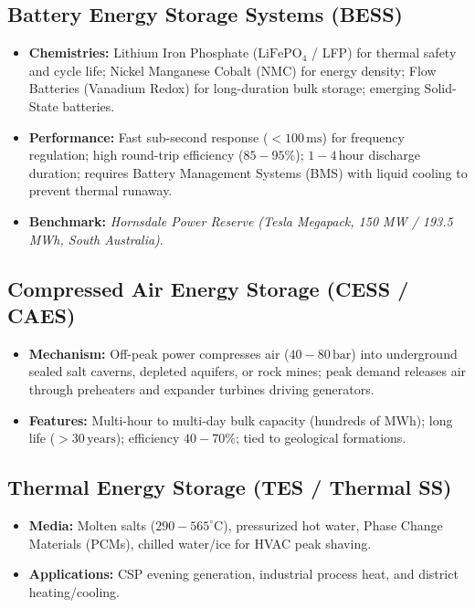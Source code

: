 \documentclass[11pt,a4paper]{article}
\begin{document}
\subsection{Battery Energy Storage Systems (BESS)}
\begin{itemize}
  \item \textbf{Chemistries:} Lithium Iron Phosphate ($\text{LiFePO}_4$ / LFP) for thermal safety and cycle life; Nickel Manganese Cobalt (NMC) for energy density; Flow Batteries (Vanadium Redox) for long-duration bulk storage; emerging Solid-State batteries.
  \item \textbf{Performance:} Fast sub-second response ($<100\,\text{ms}$) for frequency regulation; high round-trip efficiency ($85-95\%$); $1-4\,\text{hour}$ discharge duration; requires Battery Management Systems (BMS) with liquid cooling to prevent thermal runaway.
  \item \textbf{Benchmark:} \emph{Hornsdale Power Reserve (Tesla Megapack, 150 MW / 193.5 MWh, South Australia)}.
\end{itemize}

\subsection{Compressed Air Energy Storage (CESS / CAES)}
\begin{itemize}
  \item \textbf{Mechanism:} Off-peak power compresses air ($40-80\,\text{bar}$) into underground sealed salt caverns, depleted aquifers, or rock mines; peak demand releases air through preheaters and expander turbines driving generators.
  \item \textbf{Features:} Multi-hour to multi-day bulk capacity (hundreds of MWh); long life ($>30\,\text{years}$); efficiency $40-70\%$; tied to geological formations.
\end{itemize}

\subsection{Thermal Energy Storage (TES / Thermal SS)}
\begin{itemize}
  \item \textbf{Media:} Molten salts ($290-565^\circ\text{C}$), pressurized hot water, Phase Change Materials (PCMs), chilled water/ice for HVAC peak shaving.
  \item \textbf{Applications:} CSP evening generation, industrial process heat, and district heating/cooling.
\end{itemize}
\end{document}
